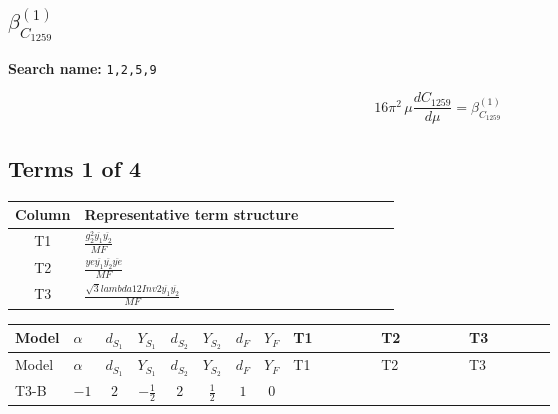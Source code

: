 \documentclass[8pt]{article}
\begin{document}
\begin{landscape}
\section*{$\beta_{C_{1259}}^{(1)}$}
\noindent\textbf{Search name: }\texttt{1,2,5,9}\par\smallskip
\[16\pi^2\,\mu\frac{d C_{1259}}{d\mu}=\beta_{C_{1259}}^{(1)}\]
\subsection*{Terms 1 of 4}
\begin{center}
\begin{tabular}{@{}c >{\raggedright\arraybackslash}p{0.82\linewidth}@{}}
\toprule
Column & Representative term structure \\
\midrule
T1 & \(\displaystyle \frac{g_{2}^{2} \overline{y_{1}} \overline{y_{2}}}{MF}\) \\
\midrule
T2 & \(\displaystyle \frac{ye \overline{y_{1}} \overline{y_{2}} \overline{ye}}{MF}\) \\
\midrule
T3 & \(\displaystyle \frac{\sqrt{3} lambda12Inv2 \overline{y_{1}} \overline{y_{2}}}{MF}\) \\
\midrule
\bottomrule
\end{tabular}
\end{center}
\smallskip
\tiny
\begin{longtable}{@{}llcccccc >{\raggedright\arraybackslash}p{0.21\linewidth} >{\raggedright\arraybackslash}p{0.21\linewidth} >{\raggedright\arraybackslash}p{0.21\linewidth}@{}}
\toprule
Model & $\alpha$ & $d_{S_1}$ & $Y_{S_1}$ & $d_{S_2}$ & $Y_{S_2}$ & $d_F$ & $Y_F$ & T1 & T2 & T3 \\
\midrule
\endfirsthead
\toprule
Model & $\alpha$ & $d_{S_1}$ & $Y_{S_1}$ & $d_{S_2}$ & $Y_{S_2}$ & $d_F$ & $Y_F$ & T1 & T2 & T3 \\
\midrule
\endhead
T3-B & $-1$ & $2$ & $-\frac{1}{2}$ & $2$ & $\frac{1}{2}$ & $1$ & $0$ & \scriptsize\adjustbox{max width=\linewidth}{$\begin{gathered} \frac{3 g_{2}^{2} \overline{y_{1}} \overline{y_{2}}}{8 MF}\end{gathered}$} & \scriptsize\adjustbox{max width=\linewidth}{$\begin{gathered} - \frac{ye \overline{y_{1}} \overline{y_{2}} \overline{ye}}{8 MF}\end{gathered}$} & \scriptsize\adjustbox{max width=\linewidth}{$\begin{gathered} \frac{\sqrt{3} lambda12Inv2 \overline{y_{1}} \overline{y_{2}}}{6 MF}\end{gathered}$} \\

\end{longtable}
\end{landscape}
\end{document}
